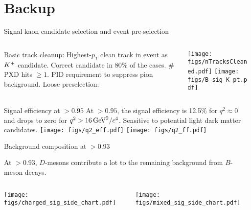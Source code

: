\section*{Backup}
\begin{frame}[noframenumbering]{Signal kaon candidate selection and event pre-selection}
\begin{columns}
\begin{column}{0.5\linewidth}
\bi
\item Basic track cleanup:
\bi
{}
\ei
\itemiii Highest-$p_T$ clean track in event as $K^+$ candidate.
\bi
\itemiii Correct candidate in 80\% of the cases.
\itemiii \# PXD hits $\ge 1$.
\itemiii PID requirement to suppress pion background.
\ei
\itemiii Loose preselection: 
\bi
{}
\ei
\ei
\end{column}
\begin{column}{0.5\linewidth}
\centering
\texttt{[image: figs/nTracksCleaned.pdf]}
\texttt{[image: figs/B\_sig\_K\_pt.pdf]}
\end{column}
\end{columns}
\end{frame}
\begin{frame}[noframenumbering]{Signal efficiency at \bdtt$>0.95$}
\bi
\itemi At \bdtt$>0.95$, the signal efficiency is 12.5\% for $q^2\approx0$ and drops to zero for $q^2>16\mathrm{\,Ge\kern -0.1em V}^2/c^4$.
\bi
\itemii Sensitive to potential light dark matter candidates.
\ei
\ei
\vspace{0.5cm}
\centering
\texttt{[image: figs/q2\_eff.pdf]}
\texttt{[image: figs/q2\_ff.pdf]}
\end{frame}
\begin{frame}[noframenumbering]{Background composition at \bdtt $>0.93$}
\bi
\item At \bdtt$>0.93$, $D$-mesons contribute a lot to the remaining  background from $B$-meson decays.
\ei
\vspace{0.5cm}
\begin{columns}
\begin{column}{0.5\linewidth}
\centering
\texttt{[image: figs/charged\_sig\_side\_chart.pdf]}
\end{column}
\begin{column}{0.5\linewidth}
\centering
\texttt{[image: figs/mixed\_sig\_side\_chart.pdf]}
\end{column}
\end{columns}
\end{frame}
